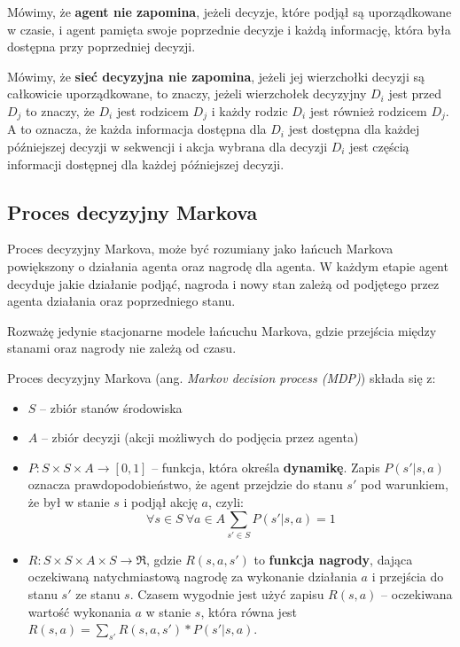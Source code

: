\documentclass[a4paper, 12pt,oneside]{book}
\begin{document}
Mówimy, że \textbf{agent nie zapomina}, jeżeli decyzje, które podjął są
uporządkowane w czasie, i agent pamięta swoje poprzednie decyzje i każdą
informację, która była dostępna przy poprzedniej decyzji.

Mówimy, że \textbf{sieć decyzyjna nie zapomina}, jeżeli jej wierzchołki decyzji
są całkowicie uporządkowane, to znaczy, jeżeli wierzchołek decyzyjny $D_i$ jest
przed $D_j$ to znaczy, że $D_i$ jest rodzicem $D_j$ i każdy rodzic $D_i$ jest
również rodzicem $D_j$. A to oznacza, że każda informacja dostępna dla $D_i$
jest dostępna dla każdej późniejszej decyzji w sekwencji i akcja wybrana dla
decyzji $D_i$ jest częścią informacji dostępnej dla każdej późniejszej decyzji.

\subsection{Proces decyzyjny Markova}
Proces decyzyjny Markova, może być rozumiany jako łańcuch Markova powiększony o
działania agenta oraz nagrodę dla agenta. W każdym etapie agent decyduje jakie
działanie podjąć, nagroda i nowy stan zależą od podjętego przez agenta
działania oraz poprzedniego stanu. 

Rozważę jedynie stacjonarne modele łańcuchu Markova, gdzie przejścia między
stanami oraz nagrody nie zależą od czasu. 

Proces decyzyjny Markova (ang. \textit{Markov decision process (MDP)}) składa
się z:
\begin{itemize}
		\setlength\itemsep{-0.4em}
	\item $S$ -- zbiór stanów środowiska
	\item $A$ -- zbiór decyzji (akcji możliwych do podjęcia przez agenta)
	\item $P: S\times S\times A\rightarrow [0,1]$ -- funkcja, która określa
		\textbf{dynamikę}. Zapis $P(s' | s, a)$ oznacza
		prawdopodobieństwo, że agent przejdzie do stanu $s'$ pod
		warunkiem, że był w stanie $s$ i podjął akcję $a$, czyli:
		\[\forall s\in S \ \forall a\in A \sum_{s' \in S}P(s'|s,a)=1\]
	\item $R:S\times S\times A\times S \rightarrow \mathfrak{R}$, gdzie
		$R(s,a,s')$ to \textbf{funkcja nagrody}, dająca oczekiwaną
		natychmiastową nagrodę za wykonanie działania $a$ i przejścia
		do stanu $s'$ ze stanu $s$. Czasem wygodnie jest użyć zapisu
		$R(s,a)$ -- oczekiwana wartość wykonania $a$ w stanie $s$,
		która równa jest $R(s,a)=\sum _{s'}R(s,a,s') * P(s'|s,a)$.
\end{itemize}
\end{document}
